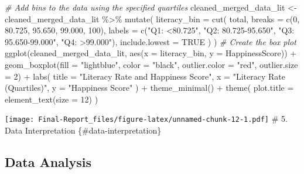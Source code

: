 \documentclass[
]{article}
\newenvironment{Shaded}{\begin{snugshade}}{\end{snugshade}}
\newcommand{\AttributeTok}[1]{\textcolor[rgb]{0.77,0.63,0.00}{#1}}
\newcommand{\CommentTok}[1]{\textcolor[rgb]{0.56,0.35,0.01}{\textit{#1}}}
\newcommand{\ConstantTok}[1]{\textcolor[rgb]{0.00,0.00,0.00}{#1}}
\newcommand{\DecValTok}[1]{\textcolor[rgb]{0.00,0.00,0.81}{#1}}
\newcommand{\FloatTok}[1]{\textcolor[rgb]{0.00,0.00,0.81}{#1}}
\newcommand{\FunctionTok}[1]{\textcolor[rgb]{0.00,0.00,0.00}{#1}}
\newcommand{\NormalTok}[1]{#1}
\newcommand{\OtherTok}[1]{\textcolor[rgb]{0.56,0.35,0.01}{#1}}
\newcommand{\SpecialCharTok}[1]{\textcolor[rgb]{0.00,0.00,0.00}{#1}}
\newcommand{\StringTok}[1]{\textcolor[rgb]{0.31,0.60,0.02}{#1}}
\begin{document}
\begin{Shaded}
\begin{Highlighting}[]
\CommentTok{\# Add bins to the data using the specified quartiles}
\NormalTok{cleaned\_merged\_data\_lit }\OtherTok{\textless{}{-}}\NormalTok{ cleaned\_merged\_data\_lit }\SpecialCharTok{\%\textgreater{}\%}
  \FunctionTok{mutate}\NormalTok{(}
    \AttributeTok{literacy\_bin =} \FunctionTok{cut}\NormalTok{(}
\NormalTok{      total,}
      \AttributeTok{breaks =} \FunctionTok{c}\NormalTok{(}\DecValTok{0}\NormalTok{, }\FloatTok{80.725}\NormalTok{, }\FloatTok{95.650}\NormalTok{, }\FloatTok{99.000}\NormalTok{, }\DecValTok{100}\NormalTok{), }
      \AttributeTok{labels =} \FunctionTok{c}\NormalTok{(}\StringTok{"Q1: \textless{}80.725"}\NormalTok{, }
                 \StringTok{"Q2: 80.725{-}95.650"}\NormalTok{, }
                 \StringTok{"Q3: 95.650{-}99.000"}\NormalTok{, }
                 \StringTok{"Q4: \textgreater{}99.000"}\NormalTok{),}
      \AttributeTok{include.lowest =} \ConstantTok{TRUE}
\NormalTok{    )}
\NormalTok{  )}
\CommentTok{\# Create the box plot}
\FunctionTok{ggplot}\NormalTok{(cleaned\_merged\_data\_lit, }\FunctionTok{aes}\NormalTok{(}\AttributeTok{x =}\NormalTok{ literacy\_bin, }\AttributeTok{y =}\NormalTok{ HappinessScore)) }\SpecialCharTok{+}
  \FunctionTok{geom\_boxplot}\NormalTok{(}\AttributeTok{fill =} \StringTok{"lightblue"}\NormalTok{, }\AttributeTok{color =} \StringTok{"black"}\NormalTok{, }\AttributeTok{outlier.color =} \StringTok{"red"}\NormalTok{, }\AttributeTok{outlier.size =} \DecValTok{2}\NormalTok{) }\SpecialCharTok{+}
  \FunctionTok{labs}\NormalTok{(}
    \AttributeTok{title =} \StringTok{"Literacy Rate and Happiness Score"}\NormalTok{,}
    \AttributeTok{x =} \StringTok{"Literacy Rate (Quartiles)"}\NormalTok{,}
    \AttributeTok{y =} \StringTok{"Happiness Score"}
\NormalTok{  ) }\SpecialCharTok{+}
  \FunctionTok{theme\_minimal}\NormalTok{() }\SpecialCharTok{+} 
  \FunctionTok{theme}\NormalTok{(}
    \AttributeTok{plot.title =} \FunctionTok{element\_text}\NormalTok{(}\AttributeTok{size =} \DecValTok{12}\NormalTok{) }
\NormalTok{  )}
\end{Highlighting}
\end{Shaded}

\texttt{[image: Final-Report\_files/figure-latex/unnamed-chunk-12-1.pdf]}
\# 5. Data Interpretation \{\#data-interpretation\}

\hypertarget{data-analysis}{%
\subsection{Data Analysis}\label{data-analysis}}
\end{document}
